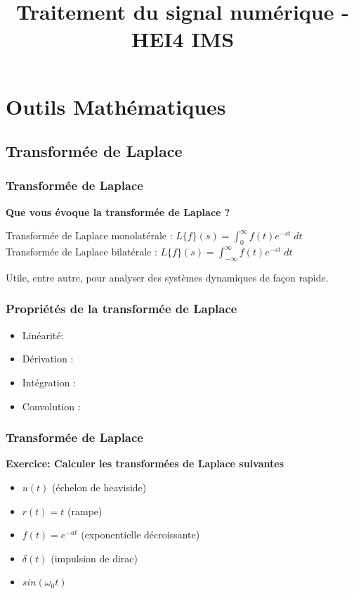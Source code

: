 \documentclass{beamer}
\title[Traitement du signal numérique]{Traitement du signal numérique - HEI4 IMS}
\author[Antony Bazir]{}
\begin{document}
\section{Outils Mathématiques}
\subsection{Transformée de Laplace}

\begin{frame}
\frametitle{Transformée de Laplace}
\textbf{Que vous évoque la transformée de Laplace ?}\\

\vspace{1cm}

{
	Transformée de Laplace monolatérale : $L\{f\}(s) = \displaystyle \int^{\infty}_{0} f(t) e^{-st} \; dt$\\ 
	\vspace{0.3cm}
	Transformée de Laplace bilatérale : $L\{f\}(s) = \displaystyle \int^{\infty}_{-\infty} f(t) e^{-st} \; dt$
}

{
\begin{block}{}
Utile, entre autre, pour analyser des systèmes dynamiques de façon rapide.
\end{block}
}

\end{frame}

\begin{frame}
\frametitle{Propriétés de la transformée de Laplace}
\begin{itemize}
\item<2-> Linéarité: 
\item<4-> Dérivation : 
\item<5-> Intégration : 
\item<7-> Convolution : 
\end{itemize}

\end{frame}

\begin{frame} 
\frametitle{Transformée de Laplace}

\textbf{Exercice: Calculer les transformées de Laplace suivantes}\\
\vspace{1cm}
\begin{itemize}
\item $u(t)$ (échelon de heaviside)
\item $r(t) = t$ (rampe)
\item $f(t) = e^{-at}$ (exponentielle décroissante)
\item $\delta (t)$ (impulsion de dirac) 
\item $sin(\omega_0 t)$
\end{itemize}

\end{frame} 
\end{document}
